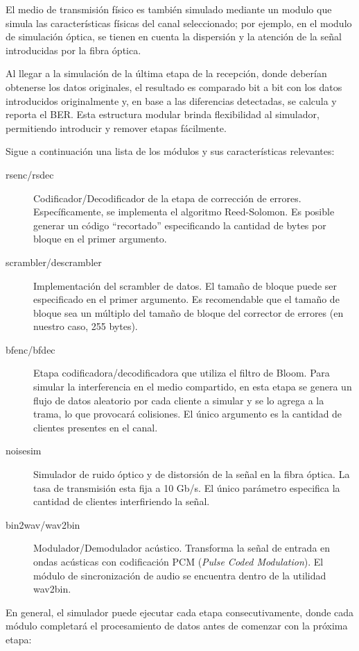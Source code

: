 El medio de transmisión físico es también simulado mediante un modulo que simula las características físicas del canal seleccionado; por ejemplo, en el modulo de simulación óptica, se tienen en cuenta la dispersión y la atención de la señal introducidas por la fibra óptica.

Al llegar a la simulación de la última etapa de la recepción, donde deberían obtenerse los datos originales, el resultado es comparado bit a bit con los datos introducidos originalmente y, en base a las diferencias detectadas, se calcula y reporta el BER. Esta estructura modular brinda flexibilidad al simulador, permitiendo introducir y remover etapas fácilmente.

Sigue a continuación una lista de los módulos y sus características relevantes:

\begin{description} 
 \item[rsenc/rsdec] Codificador/Decodificador de la etapa de corrección de errores. Específicamente, se implementa el algoritmo Reed-Solomon. Es posible generar un código ``recortado'' especificando la cantidad de bytes por bloque en el primer argumento.
 \item[scrambler/descrambler] Implementación del scrambler de datos. El tamaño de bloque puede ser especificado en el primer argumento. Es recomendable que el tamaño de bloque sea un múltiplo del tamaño de bloque del corrector de errores (en nuestro caso, 255 bytes).
 \item[bfenc/bfdec] Etapa codificadora/decodificadora que utiliza el filtro de Bloom. Para simular la interferencia en el medio compartido, en esta etapa se genera un flujo de datos aleatorio por cada cliente a simular y se lo agrega a la trama, lo que provocará colisiones. El único argumento es la cantidad de clientes presentes en el canal.
 \item[noisesim] Simulador de ruido óptico y de distorsión de la señal en la fibra óptica. La tasa de transmisión esta fija a 10 Gb/s. El único parámetro especifica la cantidad de clientes interfiriendo la señal.
 \item[bin2wav/wav2bin] Modulador/Demodulador acústico. Transforma la señal de entrada en ondas acústicas con codificación PCM (\textit{Pulse Coded Modulation}). El módulo de sincronización de audio se encuentra dentro de la utilidad wav2bin.
\end{description}

En general, el simulador puede ejecutar cada etapa consecutivamente, donde cada módulo completará el procesamiento de datos antes de comenzar con la próxima etapa:

